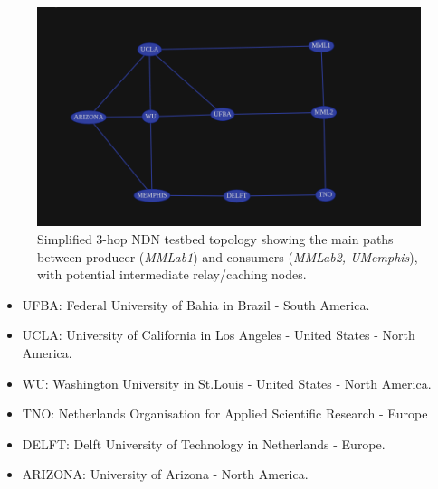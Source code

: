 \documentclass{article}
\begin{document}
\begin{figure}[H]
    \centering
    \includegraphics[width=1\linewidth]{images/ndntestbed_topology.png}
    \caption{Simplified 3-hop NDN testbed topology showing the main paths between producer (\emph{MMLab1}) and consumers (\emph{MMLab2, UMemphis}), with potential intermediate relay/caching nodes.}
    \label{fig:ndntestbed_topology}
\end{figure}

\begin{itemize}
    \item UFBA: Federal University of Bahia in Brazil - South America.
    \item UCLA: University of California in Los Angeles - United States - North America.
    \item WU: Washington University in St.Louis - United States - North America.
    \item TNO: Netherlands Organisation for Applied Scientific Research - Europe
    \item DELFT: Delft University of Technology in Netherlands - Europe.
    \item ARIZONA: University of Arizona - North America.
\end{itemize}
\end{document}
